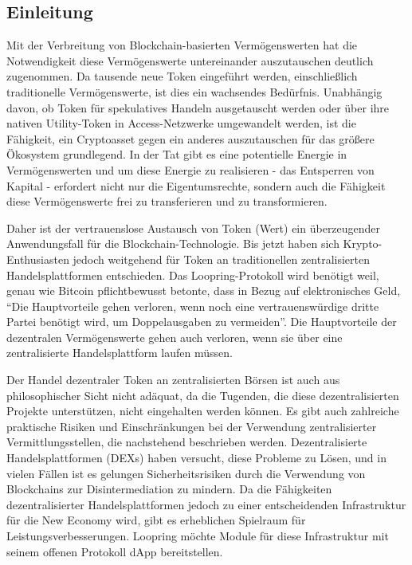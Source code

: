 \documentclass[UTF8,nofonts]{article}
\begin{document}
\begin{multicols}{2}
\section{Einleitung\label{sec:introduction}}
Mit der Verbreitung von Blockchain-basierten Vermögenswerten hat die Notwendigkeit diese Vermögenswerte untereinander auszutauschen deutlich zugenommen. Da tausende neue Token eingeführt werden, einschließlich traditionelle Vermögenswerte, ist dies ein wachsendes Bedürfnis. Unabhängig davon, ob Token für spekulatives Handeln ausgetauscht werden oder über ihre nativen Utility-Token in Access-Netzwerke umgewandelt werden, ist die Fähigkeit, ein Cryptoasset gegen ein anderes auszutauschen für das größere Ökosystem grundlegend. In der Tat gibt es eine potentielle Energie in Vermögenswerten \cite{desotocapital} und um diese Energie zu realisieren - das Entsperren von Kapital - erfordert nicht nur die Eigentumsrechte, sondern auch die Fähigkeit diese Vermögenswerte frei zu transferieren und zu transformieren.

Daher ist der vertrauenslose Austausch von Token (Wert) ein überzeugender Anwendungsfall für die Blockchain-Technologie. Bis jetzt haben sich Krypto-Enthusiasten jedoch weitgehend für Token an traditionellen zentralisierten Handelsplattformen entschieden. Das Loopring-Protokoll wird benötigt weil, genau wie Bitcoin pflichtbewusst betonte, dass in Bezug auf elektronisches Geld, \enquote{Die Hauptvorteile gehen verloren, wenn noch eine vertrauenswürdige dritte Partei benötigt wird, um Doppelausgaben zu vermeiden}. Die Hauptvorteile der dezentralen Vermögenswerte gehen auch verloren, wenn sie über eine zentralisierte Handelsplattform laufen müssen. 

Der Handel dezentraler Token an zentralisierten Börsen ist auch aus philosophischer Sicht nicht adäquat, da die Tugenden, die diese dezentralisierten Projekte unterstützen, nicht eingehalten werden können. Es gibt auch zahlreiche praktische Risiken und Einschränkungen bei der Verwendung zentralisierter Vermittlungsstellen, die nachstehend beschrieben werden. Dezentralisierte Handelsplattformen (DEXs) \cite{schuh2015bitshares} \cite{bancor} \cite{kyber} haben versucht, diese Probleme zu Lösen, und in vielen Fällen ist es gelungen Sicherheitsrisiken durch die Verwendung von Blockchains zur Disintermediation zu mindern. Da die Fähigkeiten dezentralisierter Handelsplattformen jedoch zu einer entscheidenden Infrastruktur für die New Economy wird, gibt es erheblichen Spielraum für Leistungsverbesserungen. Loopring möchte Module für diese Infrastruktur mit seinem offenen Protokoll dApp bereitstellen.


\end{multicols}
\end{document}
